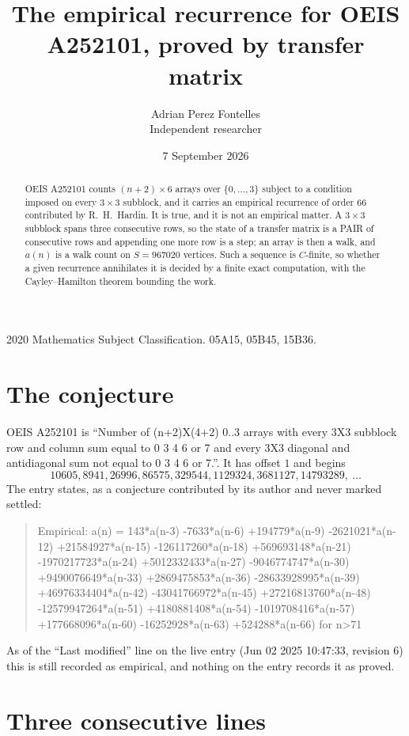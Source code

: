 \documentclass[11pt,a4paper]{article}
\title{The empirical recurrence for OEIS A252101, proved by transfer matrix}
\author{Adrian Perez Fontelles\\ \small Independent researcher}
\date{7 September 2026}
\theoremstyle{plain}
\theoremstyle{definition}
\begin{document}
\maketitle

\begin{abstract}
OEIS A252101 counts $(n+2)\times6$ arrays over $\{0,\dots,3\}$ subject to a condition imposed on
every $3\times3$ subblock, and it carries an empirical recurrence of order $66$
contributed by R.~H.~Hardin. It is true, and it is not an empirical matter. A $3\times3$
subblock spans three consecutive rows, so the state of a transfer matrix is a PAIR of
consecutive rows and appending one more row is a step; an array is then a walk, and
$a(n)$ is a walk count on $S=967020$ vertices. Such a sequence is $C$-finite, so whether a given
recurrence annihilates it is decided by a finite exact computation, with the Cayley--Hamilton
theorem bounding the work.
\end{abstract}

\noindent\small 2020 Mathematics Subject Classification. 05A15, 05B45, 15B36.\normalsize

\section{The conjecture}

OEIS A252101 is ``Number of (n+2)X(4+2) 0..3 arrays with every 3X3 subblock row and column sum equal to 0 3 4 6 or 7 and every 3X3 diagonal and antidiagonal sum not equal to 0 3 4 6 or 7.''. It has offset $1$ and begins
\[
10605, 8941, 26996, 86575, 329544, 1129324, 3681127, 14793289,\ \dots
\]
The entry states, as a conjecture contributed by its author and never marked settled:
\begin{quote}
Empirical: a(n) = 143*a(n-3) -7633*a(n-6) +194779*a(n-9) -2621021*a(n-12) +21584927*a(n-15) -126117260*a(n-18) +569693148*a(n-21) -1970217723*a(n-24) +5012332433*a(n-27) -9046774747*a(n-30) +9490076649*a(n-33) +2869475853*a(n-36) -28633928995*a(n-39) +46976334404*a(n-42) -43041766972*a(n-45) +27216813760*a(n-48) -12579947264*a(n-51) +4180881408*a(n-54) -1019708416*a(n-57) +177668096*a(n-60) -16252928*a(n-63) +524288*a(n-66) for n>71
\end{quote}
As of the ``Last modified'' line on the live entry (Jun 02 2025 10:47:33, revision 6) this is still
recorded as empirical, and nothing on the entry records it as proved.

\section{Three consecutive lines}
\end{document}

